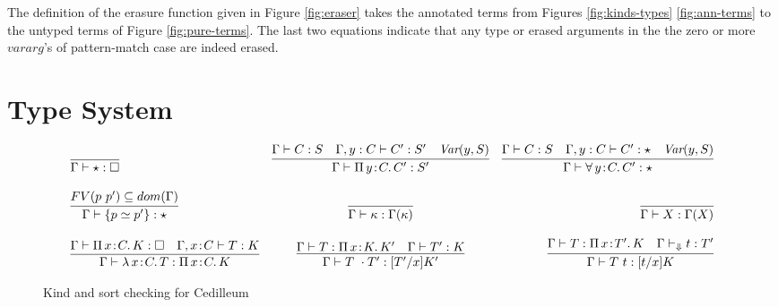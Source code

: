 \documentclass{article}
\newcommand{\ann}[2]{#1\! : \! #2}
\newcommand{\abs}[4]{{#1}\, #2\! : \! #3.\, #4}
\newcommand{\decchk}{\vdash_{\Downarrow}}
\begin{document}
The definition of the erasure function given in Figure \ref{fig:eraser} takes
the annotated terms from Figures \ref{fig:kinds-types} \ref{fig:ann-terms} to
the untyped terms of Figure \ref{fig:pure-terms}. The last two equations
indicate that any type or erased arguments in the the zero or more $vararg$'s of
pattern-match case are indeed erased.

\section{Type System}
\label{sec:type-system}

\begin{figure}[h]
  \[
    \begin{array}{lcr}
      \infer{\Gamma\vdash \star : \Box}{\ }
      & \infer
        { \Gamma\vdash\abs{\Pi}{y}{C}{C'} : S'}
        { \Gamma \vdash C : S
        \quad
        \Gamma,y:C\vdash C' : S'
        \quad \textit{Var}(y,S)
        }
      & \infer
        {\Gamma\vdash\abs{\forall}{y}{C}{C'} : \star}
        {\Gamma \vdash C : S
        \quad \Gamma,y:C\vdash C' : \star
        \quad \textit{Var}(y,S)
        }
      \\
      \\ \infer
      { \Gamma \vdash \{p \simeq p' \} : \star}
      { FV(p\ p') \subseteq dom(\Gamma) }
      & \infer
        { \Gamma \vdash \kappa : \Gamma(\kappa)}
        { }
      & \infer
        { \Gamma \vdash X : \Gamma(X)}
        { }
      \\
      \\ \infer
      { \Gamma \vdash \abs{\lambda}{x}{C}{T} : \abs{\Pi}{x}{C}{K}}
      { \Gamma \vdash \abs{\Pi}{x}{C}{K} : \square
      \quad \Gamma, \ann{x}{C} \vdash T : K
      }
      & \infer
        { \Gamma \vdash T\ \cdot T' : [T'/x] K'}
        { \Gamma \vdash T : \abs{\Pi}{x}{K}{K'}
        \quad \Gamma \vdash T' : K}
      & \infer
       { \Gamma \vdash T\ t : [t/x] K}
        { \Gamma \vdash T : \abs{\Pi}{x}{T'}{K}
        \quad \Gamma \decchk t : T' }
    \end{array}
  \]
  \caption{Kind and sort checking for Cedilleum }
\end{figure}
\end{document}
